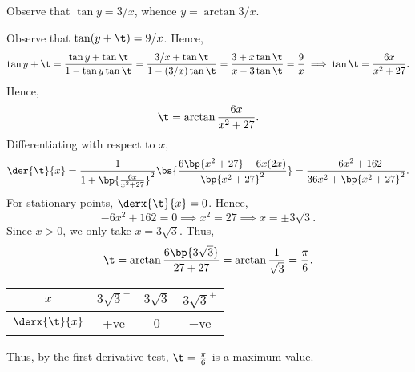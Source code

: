 \begin{solution}
    \begin{ppart}
        Observe that $\tan y = 3/x$, whence $y = \arctan{3/x}$.
    \end{ppart}
    \begin{ppart}
        Observe that $\tan(y + \t) = 9/x$. Hence, \[\tan{y + \t} = \frac{\tan y + \tan \t}{1 - \tan y \tan \t} = \frac{3/x + \tan \t}{1 - (3/x) \tan \t} = \frac{3 + x\tan\t}{x - 3\tan\t} = \frac9x \implies \tan \t = \frac{6x}{x^2 + 27}.\] Hence, \[\t = \arctan{\frac{6x}{x^2 + 27}}.\] Differentiating with respect to $x$, \[\der{\t}{x} = \frac{1}{1 + \bp{\frac{6x}{x^2 + 27}}^2} \bs{\frac{6\bp{x^2 + 27} - 6x(2x)}{\bp{x^2 + 27}^2}} = \frac{-6x^2 + 162}{36x^2 + \bp{x^2+27}^2}.\] For stationary points, $\derx{\t}{x} = 0$. Hence, \[-6x^2 + 162 = 0 \implies x^2 = 27 \implies x = \pm 3\sqrt3.\] Since $x > 0$, we only take $x = 3\sqrt{3}$. Thus, \[\t = \arctan{\frac{6\bp{3\sqrt3}}{27 + 27}} = \arctan{\frac1{\sqrt3}} = \frac\pi6.\]
        \begin{table}[H]
            \centering
            \begin{tabular}{|c|c|c|c|}
            \hline
            $x$ & $3\sqrt{3}^-$ & $3\sqrt{3}$ & $3\sqrt{3}^+$ \\\hline
            $\derx{\t}{x}$ & +ve   & 0 & $-$ve   \\\hline
            \end{tabular}
        \end{table}
        Thus, by the first derivative test, $\t = \frac{\pi}6$ is a maximum value.
    \end{ppart}
\end{solution}

